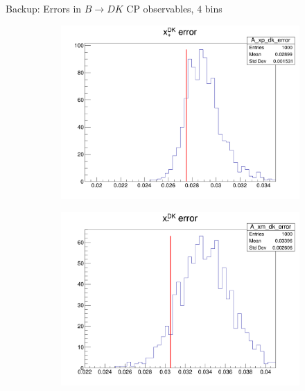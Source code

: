 \documentclass{beamer}
\begin{document}
\begin{frame}{Backup: Errors in $B\to DK$ CP observables, $4$ bins}
  \begin{figure}
    \centering
    \vspace{-0.2cm}
    \begin{subfigure}{0.42\textwidth}
      \includegraphics[width = 1.0\textwidth]{A_xp_dk_4Bins_error.png}
    \end{subfigure}%
    \begin{subfigure}{0.42\textwidth}
      \includegraphics[width = 1.0\textwidth]{A_xm_dk_4Bins_error.png}
    \end{subfigure}
    \begin{subfigure}{0.42\textwidth}

\end{subfigure}
\end{figure}
\end{frame}
\end{document}
